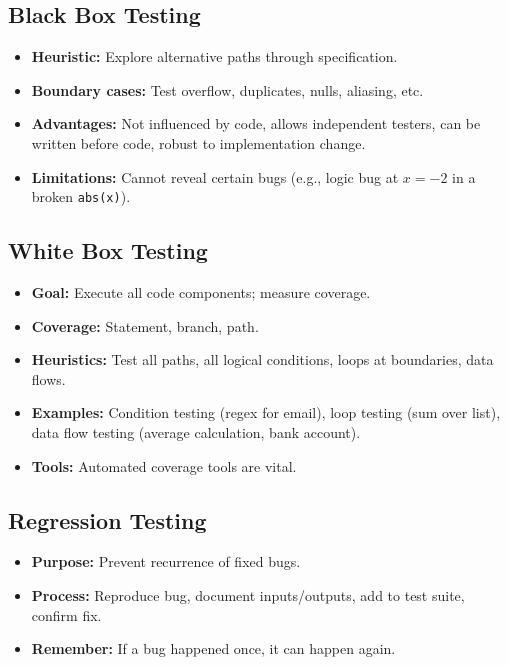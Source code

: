 \documentclass[11pt,a4paper]{article}
\begin{document}
\subsection*{Black Box Testing}
\begin{itemize}
    \item \textbf{Heuristic:} Explore alternative paths through specification.
    \item \textbf{Boundary cases:} Test overflow, duplicates, nulls, aliasing, etc.
    \item \textbf{Advantages:} Not influenced by code, allows independent testers, can be written before code, robust to implementation change.
    \item \textbf{Limitations:} Cannot reveal certain bugs (e.g., logic bug at $x = -2$ in a broken \texttt{abs(x)}).
\end{itemize}

\subsection*{White Box Testing}
\begin{itemize}
    \item \textbf{Goal:} Execute all code components; measure coverage.
    \item \textbf{Coverage:} Statement, branch, path.
    \item \textbf{Heuristics:} Test all paths, all logical conditions, loops at boundaries, data flows.
    \item \textbf{Examples:} Condition testing (regex for email), loop testing (sum over list), data flow testing (average calculation, bank account).
    \item \textbf{Tools:} Automated coverage tools are vital.
\end{itemize}

\subsection*{Regression Testing}
\begin{itemize}
    \item \textbf{Purpose:} Prevent recurrence of fixed bugs.
    \item \textbf{Process:} Reproduce bug, document inputs/outputs, add to test suite, confirm fix.
    \item \textbf{Remember:} If a bug happened once, it can happen again.
\end{itemize}
\end{document}

